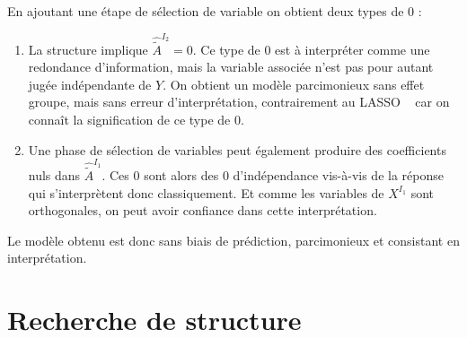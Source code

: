 \documentclass[12pt]{article}
\begin{document}
		En ajoutant une étape de sélection de variable on obtient deux types de $0$ :
			\begin{enumerate}
			\item La structure implique $\hat{\tilde{A}}^{I_2} = 0 $. Ce type de 0 est à interpréter comme une redondance d'information, mais la variable associée n'est pas pour autant jugée indépendante de $Y$. On obtient un modèle parcimonieux sans effet groupe, mais sans erreur d'interprétation, contrairement au LASSO ~\cite{Zhao2006MSC} car on connaît la signification de ce type de $0$.
			\item Une phase de sélection de variables peut également produire des coefficients nuls dans $\hat{\tilde{A}}^{I_1}$. Ces $0$ sont alors des $0$ d'indépendance vis-à-vis de la réponse qui s'interprètent donc classiquement. Et comme les variables de $X^{I_1}$ sont orthogonales, on peut avoir confiance dans cette interprétation.
			\end{enumerate}
		Le modèle obtenu est donc sans biais de prédiction, parcimonieux et consistant en interprétation.	
\section{Recherche de structure}
	 	
\end{document}
